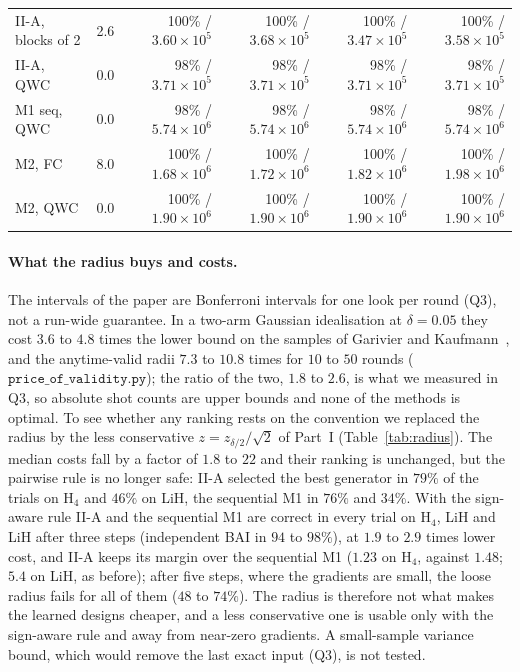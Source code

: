 \documentclass[aps,pra,reprint,superscriptaddress,nofootinbib]{revtex4-2}
\begin{document}
\begin{table}[!htb]
\begin{tabular}{lrrrrr}
II-A, blocks of 2 & 2.6 & 100\% / $3.60\times10^{5}$ & 100\% / $3.68\times10^{5}$ & 100\% / $3.47\times10^{5}$ & 100\% / $3.58\times10^{5}$ \\
II-A, QWC & 0.0 & 98\% / $3.71\times10^{5}$ & 98\% / $3.71\times10^{5}$ & 98\% / $3.71\times10^{5}$ & 98\% / $3.71\times10^{5}$ \\
M1 seq, QWC & 0.0 & 98\% / $5.74\times10^{6}$ & 98\% / $5.74\times10^{6}$ & 98\% / $5.74\times10^{6}$ & 98\% / $5.74\times10^{6}$ \\
M2, FC & 8.0 & 100\% / $1.68\times10^{6}$ & 100\% / $1.72\times10^{6}$ & 100\% / $1.82\times10^{6}$ & 100\% / $1.98\times10^{6}$ \\
M2, QWC & 0.0 & 100\% / $1.90\times10^{6}$ & 100\% / $1.90\times10^{6}$ & 100\% / $1.90\times10^{6}$ & 100\% / $1.90\times10^{6}$ \\
\bottomrule
\end{tabular}
\end{table}

\paragraph{What the radius buys and costs.} The intervals of the paper are Bonferroni intervals for one look per round (Q3), not a run-wide guarantee. In a two-arm Gaussian idealisation at $\delta=0.05$ they cost $3.6$ to $4.8$ times the lower bound on the samples of Garivier and Kaufmann~\cite{garivier2016}, and the anytime-valid radii $7.3$ to $10.8$ times for $10$ to $50$ rounds ($\texttt{price\_of\_validity.py}$); the ratio of the two, $1.8$ to $2.6$, is what we measured in Q3, so absolute shot counts are upper bounds and none of the methods is optimal. To see whether any ranking rests on the convention we replaced the radius by the less conservative $z=z_{\delta/2}/\sqrt2$ of Part~I (Table~\ref{tab:radius}). The median costs fall by a factor of $1.8$ to $22$ and their ranking is unchanged, but the pairwise rule is no longer safe: II-A selected the best generator in $79\%$ of the trials on H$_4$ and $46\%$ on LiH, the sequential M1 in $76\%$ and $34\%$. With the sign-aware rule II-A and the sequential M1 are correct in every trial on H$_4$, LiH and LiH after three steps (independent BAI in $94$ to $98\%$), at $1.9$ to $2.9$ times lower cost, and II-A keeps its margin over the sequential M1 ($1.23$ on H$_4$, against $1.48$; $5.4$ on LiH, as before); after five steps, where the gradients are small, the loose radius fails for all of them ($48$ to $74\%$). The radius is therefore not what makes the learned designs cheaper, and a less conservative one is usable only with the sign-aware rule and away from near-zero gradients. A small-sample variance bound, which would remove the last exact input (Q3), is not tested.
\end{document}
